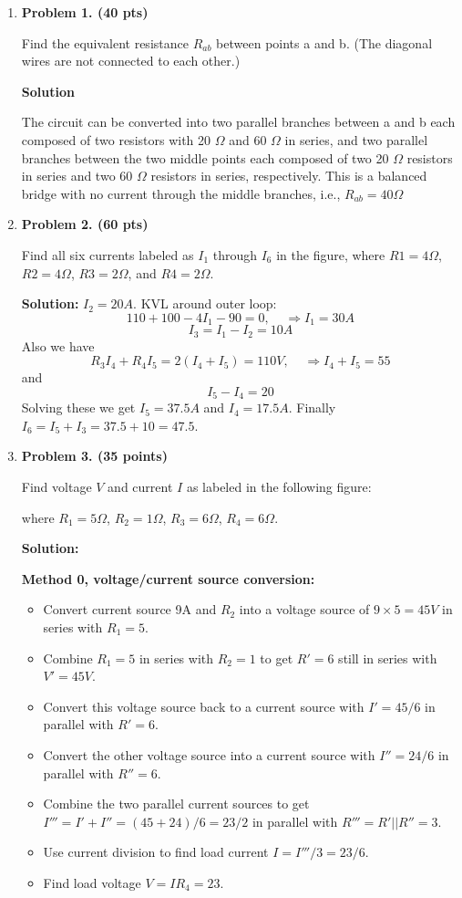 \begin{enumerate}

\item {\bf Problem 1. (40 pts)}

  Find the equivalent resistance $R_{ab}$ between points a and b. (The diagonal
  wires are not connected to each other.)


  {\bf Solution}

  The circuit can be converted into two parallel branches between a and b
  each composed of two resistors with 20 $\Omega$ and 60 $\Omega$ in series,
  and two parallel branches between the two middle points each composed of 
  two 20 $\Omega$ resistors in series and two 60 $\Omega$ resistors in
  series, respectively. This is a balanced bridge with no current through
  the middle branches, i.e., $R_{ab}=40\Omega$

\item {\bf Problem 2. (60 pts)}

  Find all six currents labeled as $I_1$ through $I_6$ in the figure, where
  $R1=4\Omega$, $R2=4\Omega$, $R3=2\Omega$, and $R4=2\Omega$.


  {\bf Solution:}
  $I_2=20A$.
  KVL around outer loop:
  \[ 110+100-4I_1-90=0,\;\;\;\;\Rightarrow I_1=30A \]
  \[ I_3=I_1-I_2=10A \]
  Also  we have
  \[ R_3I_4+R_4I_5=2(I_4+I_5)=110 V,\;\;\;\;\Rightarrow I_4+I_5=55 \]
  and
  \[ I_5-I_4=20 \]
  Solving these we get $I_5=37.5A$ and $I_4=17.5A$.
  Finally $I_6=I_5+I_3=37.5+10=47.5$.

\item {\bf Problem 3. (35 points)}

  Find voltage $V$ and current $I$ as labeled in the following figure:


  where $R_1=5\Omega$, $R_2=1\Omega$, $R_3=6\Omega$, $R_4=6\Omega$.

  {\bf Solution:}

  {\bf Method 0, voltage/current source conversion:}
  \begin{itemize}
  \item Convert current source 9A and $R_2$ into a voltage source of $9\times 5=45V$
    in series with $R_1=5$. 
  \item Combine $R_1=5$ in series with $R_2=1$ to get $R'=6$ still in series with 
    $V'=45V$. 
  \item Convert this voltage source back to a current source with $I'=45/6$ in 
    parallel with $R'=6$. 
  \item Convert the other voltage source into a current source with $I''=24/6$ in
    parallel with $R''=6$.
  \item Combine the two parallel current sources to get $I'''=I'+I''=(45+24)/6=23/2$
    in parallel with $R'''=R'||R''=3$.
  \item Use current division to find load current $I=I'''/3=23/6$.
  \item Find load voltage $V=IR_4=23$.
  \end{itemize}


\end{enumerate}
